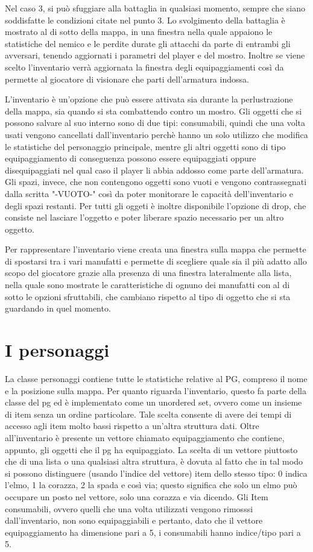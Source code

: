 \documentclass[12pt]{report}
\begin{document}
Nel caso 3, si può sfuggiare alla battaglia in qualsiasi momento, sempre che siano soddisfatte le condizioni citate nel
punto 3.  Lo svolgimento della battaglia è mostrato al di sotto della mappa, in una finestra nella quale appaiono le
statistiche del nemico e le perdite durate gli attacchi da parte di entrambi gli avversari, tenendo aggiornati i
parametri del player e del mostro. Inoltre se viene scelto l'inventario verrà aggiornata la finestra degli
equipaggiamenti così da permette al giocatore di visionare che parti dell'armatura indossa. 

L'inventario è un'opzione che può essere attivata sia durante la perlustrazione della mappa, sia quando si sta
combattendo contro un mostro. Gli oggetti che si possono salvare al suo interno sono di due tipi: consumabili, quindi
che una volta usati vengono cancellati dall'inventario perchè hanno un solo utilizzo che modifica le statistiche del
personaggio principale, mentre gli altri oggetti sono di tipo equipaggiamento di conseguenza possono essere equipaggiati
oppure disequipaggiati nel qual caso il player li abbia addosso come parte dell'armatura. Gli spazi, invece, che non
contengono oggetti sono vuoti e vengono contrassegnati dalla scritta "-VUOTO-" così da poter monitorare le capacità
dell'inventario e degli spazi restanti. Per tutti gli oggeti è inoltre disponibile l'opzione di drop, che consiste nel
lasciare l'oggetto e poter liberare spazio necessario per un altro oggetto. 

Per rappresentare l'inventario viene creata una finestra sulla mappa che permette di spostarsi tra i vari manufatti e
permette di scegliere quale sia il più adatto allo scopo del giocatore grazie alla presenza di una finestra lateralmente
alla lista, nella quale sono mostrate le caratteristiche di ognuno dei manufatti con al di sotto le opzioni sfruttabili,
che cambiano rispetto al tipo di oggetto che si sta guardando in quel momento.

\section{I personaggi}

La classe personaggi contiene tutte le statistiche relative al PG, compreso il nome e la posizione sulla
mappa. 
Per quanto riguarda l'inventario, questo fa parte della classe del pg ed è implementato come un 
unordered set, ovvero come un insieme di item senza un ordine particolare. Tale scelta consente di avere
dei tempi di accesso agli item molto bassi rispetto a un'altra struttura dati. 
Oltre all'inventario è presente un vettore chiamato equipaggiamento che contiene, appunto,
gli oggetti che il pg ha equipaggiato. La scelta di un vettore piuttosto che di una lista o una qualsiasi
altra struttura, è dovuta al fatto che in tal modo si possono distinguere (usando l'indice del vettore) 
item dello stesso tipo: 0 indica l'elmo, 1 la corazza, 2 la spada e così via; questo significa che solo
un elmo può occupare un posto nel vettore, solo una corazza e via dicendo. Gli Item consumabili, ovvero 
quelli che una volta utilizzati vengono rimosssi dall'inventario, non sono equipaggiabili e pertanto, 
dato che il vettore equipaggiamento ha dimensione pari a 5, i consumabili hanno indice/tipo pari a 5.
\end{document}
